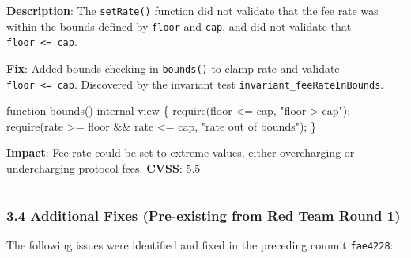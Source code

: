 \documentclass[
]{article}
\newenvironment{Shaded}{}{}
\newcommand{\NormalTok}[1]{#1}
\begin{document}
\textbf{Description}: The \texttt{setRate()} function did not validate
that the fee rate was within the bounds defined by \texttt{floor} and
\texttt{cap}, and did not validate that
\texttt{floor\ \textless{}=\ cap}.

\textbf{Fix}: Added bounds checking in \texttt{bounds()} to clamp rate
and validate \texttt{floor\ \textless{}=\ cap}. Discovered by the
invariant test \texttt{invariant\_feeRateInBounds}.

\begin{Shaded}
\begin{Highlighting}[]
\NormalTok{function bounds() internal view \{}
\NormalTok{    require(floor \textless{}= cap, "floor \textgreater{} cap");}
\NormalTok{    require(rate \textgreater{}= floor \&\& rate \textless{}= cap, "rate out of bounds");}
\NormalTok{\}}
\end{Highlighting}
\end{Shaded}

\textbf{Impact}: Fee rate could be set to extreme values, either
overcharging or undercharging protocol fees. \textbf{CVSS}: 5.5

\begin{center}\rule{0.5\linewidth}{0.5pt}\end{center}

\subsubsection{3.4 Additional Fixes (Pre-existing from Red Team Round
1)}\label{34-additional-fixes-pre-existing-from-red-team-round-1}

The following issues were identified and fixed in the preceding commit
\texttt{fae4228}:
\end{document}
